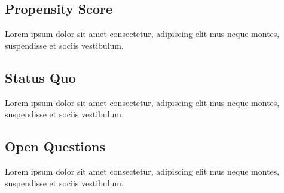 \subsection{Propensity Score}
Lorem ipsum dolor sit amet consectetur, adipiscing elit mus neque montes, suspendisse et sociis vestibulum.

\subsection{Status Quo}
Lorem ipsum dolor sit amet consectetur, adipiscing elit mus neque montes, suspendisse et sociis vestibulum.

\subsection{Open Questions}
Lorem ipsum dolor sit amet consectetur, adipiscing elit mus neque montes, suspendisse et sociis vestibulum.

